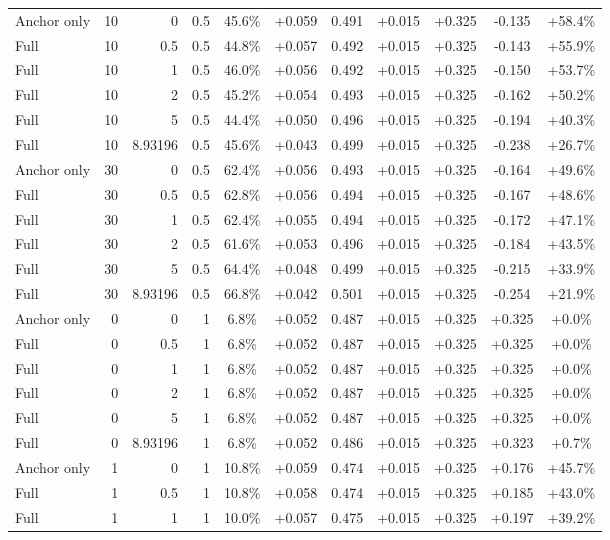 \begin{table}[htbp]
\begin{tabular}{lrrrccccccc}
Anchor only & 10 & 0 & 0.5 & 45.6\% & +0.059 & 0.491 & +0.015 & +0.325 & -0.135 & +58.4\% \\
Full & 10 & 0.5 & 0.5 & 44.8\% & +0.057 & 0.492 & +0.015 & +0.325 & -0.143 & +55.9\% \\
Full & 10 & 1 & 0.5 & 46.0\% & +0.056 & 0.492 & +0.015 & +0.325 & -0.150 & +53.7\% \\
Full & 10 & 2 & 0.5 & 45.2\% & +0.054 & 0.493 & +0.015 & +0.325 & -0.162 & +50.2\% \\
Full & 10 & 5 & 0.5 & 44.4\% & +0.050 & 0.496 & +0.015 & +0.325 & -0.194 & +40.3\% \\
Full & 10 & 8.93196 & 0.5 & 45.6\% & +0.043 & 0.499 & +0.015 & +0.325 & -0.238 & +26.7\% \\
Anchor only & 30 & 0 & 0.5 & 62.4\% & +0.056 & 0.493 & +0.015 & +0.325 & -0.164 & +49.6\% \\
Full & 30 & 0.5 & 0.5 & 62.8\% & +0.056 & 0.494 & +0.015 & +0.325 & -0.167 & +48.6\% \\
Full & 30 & 1 & 0.5 & 62.4\% & +0.055 & 0.494 & +0.015 & +0.325 & -0.172 & +47.1\% \\
Full & 30 & 2 & 0.5 & 61.6\% & +0.053 & 0.496 & +0.015 & +0.325 & -0.184 & +43.5\% \\
Full & 30 & 5 & 0.5 & 64.4\% & +0.048 & 0.499 & +0.015 & +0.325 & -0.215 & +33.9\% \\
Full & 30 & 8.93196 & 0.5 & 66.8\% & +0.042 & 0.501 & +0.015 & +0.325 & -0.254 & +21.9\% \\
Anchor only & 0 & 0 & 1 & 6.8\% & +0.052 & 0.487 & +0.015 & +0.325 & +0.325 & +0.0\% \\
Full & 0 & 0.5 & 1 & 6.8\% & +0.052 & 0.487 & +0.015 & +0.325 & +0.325 & +0.0\% \\
Full & 0 & 1 & 1 & 6.8\% & +0.052 & 0.487 & +0.015 & +0.325 & +0.325 & +0.0\% \\
Full & 0 & 2 & 1 & 6.8\% & +0.052 & 0.487 & +0.015 & +0.325 & +0.325 & +0.0\% \\
Full & 0 & 5 & 1 & 6.8\% & +0.052 & 0.487 & +0.015 & +0.325 & +0.325 & +0.0\% \\
Full & 0 & 8.93196 & 1 & 6.8\% & +0.052 & 0.486 & +0.015 & +0.325 & +0.323 & +0.7\% \\
Anchor only & 1 & 0 & 1 & 10.8\% & +0.059 & 0.474 & +0.015 & +0.325 & +0.176 & +45.7\% \\
Full & 1 & 0.5 & 1 & 10.8\% & +0.058 & 0.474 & +0.015 & +0.325 & +0.185 & +43.0\% \\
Full & 1 & 1 & 1 & 10.0\% & +0.057 & 0.475 & +0.015 & +0.325 & +0.197 & +39.2\% \\

\end{tabular}
\end{table}
